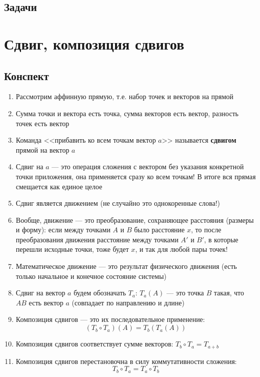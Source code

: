 \subsection{Задачи}





\section{Сдвиг, композиция сдвигов}

\subsection{Конспект}
\begin{enumerate}\setlength{\itemsep}{1pt}
\item Рассмотрим аффинную прямую, т.е. набор точек и векторов на прямой
\item Сумма точки и вектора есть точка, сумма векторов есть вектор, разность точек есть вектор
\item Команда <<прибавить ко всем точкам вектор $a$>> называется \textbf{сдвигом} прямой на вектор $a$
\item Сдвиг на $a$ --- это операция сложения с вектором без указания конкретной точки приложения, она применяется сразу ко всем точкам! В итоге вся прямая смещается как единое целое
\item Сдвиг является движением (не случайно это однокоренные слова!)
\item Вообще, движение --- это преобразование, сохраняющее расстояния (размеры и форму): если между точками $A$ и $B$ было расстояние $x$, то после преобразования движения расстояние между точками $A'$ и $B'$, в которые перешли исходные точки, тоже будет $x$, и так для любой пары точек!
\item Математическое движение --- это результат физического движения (есть только начальное и конечное состояние системы)
\item Сдвиг на вектор $a$ будем обозначать $T_a$: $T_a(A)$ --- это точка $B$ такая, что $AB$ есть вектор $a$ (совпадает по направлению и длине)
\item Композиция сдвигов --- это их последовательное применение: $$(T_b\circ T_a)(A)=T_b(T_a(A))$$
\item Композиция сдвигов соответствует сумме векторов: $T_b\circ T_a=T_{a+b}$
\item Композиция сдвигов перестановочна в силу коммутативности сложения: $$T_b\circ T_a=T_a\circ T_b$$

\end{enumerate}
